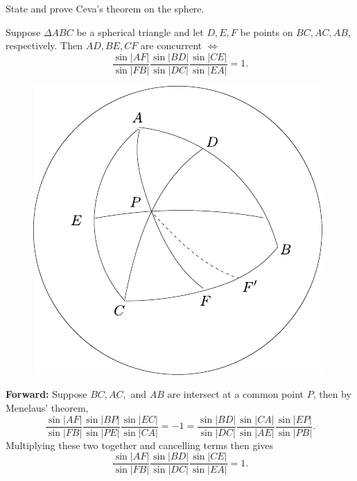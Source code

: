 \documentclass[twoside,10pt]{article}
\begin{document}
\begin{exer}[10.26]
State and prove Ceva's theorem on the sphere.
\end{exer}

\begin{thrm}
Suppose $\Delta ABC$ be a spherical triangle and let $D,E,F$ be points on $BC,AC,AB$, respectively. Then $AD,BE,CF$ are concurrent $\iff$ 
\[
\frac{\sin|AF|}{\sin|FB|} \frac{\sin|BD|}{\sin|DC|} \frac{\sin|CE|}{\sin|EA|} =1.
\] 
\end{thrm}

\begin{figure}[H]
	\centering
	\includegraphics[scale=1]{fig/26.pdf}
\end{figure}

\textbf{Forward:} Suppose $BC,AC,$ and $AB$ are intersect at a common point $P$, then by Menelaus' theorem,
\[
	\frac{\sin|AF|}{\sin|FB|} \frac{\sin|BP|}{\sin|PE|} \frac{\sin|EC|}{\sin|CA|} = -1 = \frac{\sin|BD|}{\sin|DC|} \frac{\sin|CA|}{\sin|AE|} \frac{\sin|EP|}{\sin|PB|} .
\] Multiplying these two together and cancelling terms then gives
\[
\frac{\sin|AF|}{\sin|FB|}\frac{\sin|BD|}{\sin|DC|} \frac{\sin|CE|}{\sin|EA|} = 1.
\] 
\end{document}
